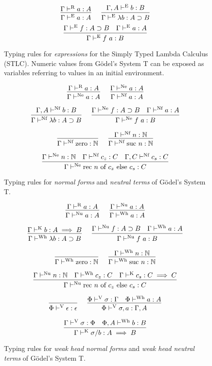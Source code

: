 \documentclass[preprint,authoryear]{sigplanconf}
\def\turnstyle{\vdash}
\def\asc{:}
\def\arr{\supset}
\def\nat{\mathbb{N}}
\def\emp{\epsilon}
\def\zero{\con{zero}}
\newcommand{\suc}[1]{\con{suc}~#1}
\newcommand{\rec}[3]{\con{rec}~#1~\con{of}~#2~\con{else}~#3}
\newcommand{\con}[1]{\textmd{#1}}
\newcommand{\turn}[1]{\turnstyle^\con{#1}}
\newcommand{\typr}[2]{\Gamma \turn{R}  #1 \asc #2}
\newcommand{\type}[2]{\ctype{\Gamma}{#1}{#2}}
\newcommand{\ctype}[3]{#1 \turn{E}  #2 \asc #3}
\newcommand{\typnf}[2]{\ctypnf{\Gamma}{#1}{#2}}
\newcommand{\ctypnf}[3]{#1 \turn{Nf}  #2 \asc #3}
\newcommand{\typne}[2]{\Gamma \turn{Ne}  #1 \asc #2}
\newcommand{\typk}[3]{\Gamma \turn{K}  #1 \asc #2 \implies #3}
\newcommand{\typv}[3]{#1 \turn{V}  #2 \asc #3}
\newcommand{\typwh}[2]{\ctypwh{\Gamma}{#1}{#2}}
\newcommand{\ctypwh}[3]{#1 \turn{Wh}  #2 \asc #3}
\newcommand{\typnu}[2]{\Gamma \turn{Nu}  #1 \asc #2}
\begin{document}
\begin{figure}[t!]
\caption{
Typing rules for \textit{expressions} for the Simply Typed Lambda
Calculus (STLC). Numeric values from G{\"o}del's System T can be
exposed as variables referring to values in an initial environment.
}
$$
\infer
  []
  {\type{a}{A}}
{
  \typr{a}{A}
}
\quad
\infer
  []
  {\type{\lambda b}{A \arr B}}
{
  \ctype{\Gamma, A}{b}{B}
}
$$
$$
\infer
  []
  {\type{f~a}{B}}
{
  \type{f}{A \arr B}
  &
  \type{a}{A}
}
$$
\label{fig:type:exp}
\end{figure}

\begin{figure}[t!]
\caption{
Typing rules for \textit{normal forms} and \textit{neutral terms} of G{\"o}del's System T.
}
$$
\infer
  []
  {\typne{a}{A}}
{
  \typr{a}{A}
}
\quad
\infer
  []
  {\typnf{a}{A}}
{
  \typne{a}{A}
}
$$

$$
\infer
  []
  {\typnf{\lambda b}{A \arr B}}
{
  \ctypnf{\Gamma, A}{b}{B}
}
\quad
\infer
  []
  {\typne{f~a}{B}}
{
  \typne{f}{A \arr B}
  &
  \typnf{a}{A}
}
$$

$$
\infer
  []
  {\typnf{\zero}{\nat}}
{
}
\quad
\infer
  []
  {\typnf{\suc{n}}{\nat}}
{
  \typnf{n}{\nat}
}
$$

$$
\infer
  []
  {\typne{\rec{n}{c_z}{c_s}}{C}}
{
  \typne{n}{\nat}
  &
  \typnf{c_z}{C}
  &
  \ctypnf{\Gamma, C}{c_s}{C}
}
$$

\label{fig:type:nf}
\end{figure}

\begin{figure}[t!]
\caption{
Typing rules for \textit{weak head normal forms} and
\textit{weak head neutral terms} of G{\"o}del's System T.
}

$$
\infer
  []
  {\typnu{a}{A}}
{
  \typr{a}{A}
}
\quad
\infer
  []
  {\typwh{a}{A}}
{
  \typnu{a}{A}
}
$$

$$
\infer
  []
  {\typwh{\lambda b}{A \arr B}}
{
  \typk{b}{A}{B}
}
\quad
\infer
  []
  {\typnu{f~a}{B}}
{
  \typnu{f}{A \arr B}
  &
  \typwh{a}{A}
}
$$

$$
\infer
  []
  {\typwh{\zero}{\nat}}
{
}
\quad
\infer
  []
  {\typwh{\suc{n}}{\nat}}
{
  \typwh{n}{\nat}
}
$$

$$
\infer
  []
  {\typnu{\rec{n}{c_z}{c_s}}{C}}
{
  \typnu{n}{\nat}
  &
  \typwh{c_z}{C}
  &
  \typk{c_s}{C}{C}
}
$$

$$
\infer
  []
  {\typv{\Phi}{\emp}{\emp}}
{
}
\quad
\infer
  []
  {\typv{\Phi}{\sigma, a}{\Gamma, A}}
{
  \typv{\Phi}{\sigma}{\Gamma}
  &
  \ctypwh{\Phi}{a}{A}
}
$$

$$
\infer
  []
  {\typk{\sigma / b}{A}{B}}
{
  \typv{\Gamma}{\sigma}{\Phi}
  &
  \ctypwh{\Phi, A}{b}{B}
}
$$

\label{fig:type:wh}
\end{figure}
\end{document}
